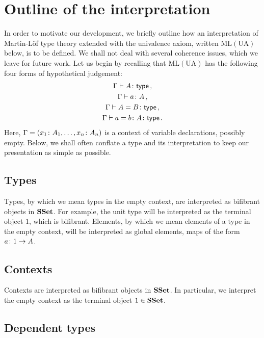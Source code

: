 \documentclass[reqno,10pt,a4paper,oneside,draft]{amsart}
\begin{document}
\section{Outline of the interpretation} 

In order to motivate our development, we briefly outline how an interpretation of Martin-L\"of type theory 
extended with the univalence axiom, written $\mathrm{ML(UA)}$ below, is to be defined. We shall not deal with several coherence issues, which we leave for future work. Let us begin by recalling that  $\mathrm{ML(UA)}$ has the following four forms of hypothetical judgement:
\begin{gather*}
 \Gamma \vdash A \colon \mathsf{type} \, ,  \\ 
 \Gamma \vdash a \colon A \, , \\
  \Gamma \vdash A  = B \colon \mathsf{type} \, ,  \\
 \Gamma \vdash a = b \colon A \colon \mathsf{type} \, .
  \end{gather*}
Here, $\Gamma  = (x_1 \colon A_1, \ldots, x_n \colon A_n)$ is a  context of variable declarations, possibly empty. Below, we shall often conflate a type and its interpretation to keep our presentation as simple as possible.

\subsection*{Types}

Types, by which we mean types in the empty context, are interpreted as bifibrant objects in $\mathbf{SSet}$. For example, the unit type will be interpreted as the terminal object $1$, which is bifibrant. Elements, by which we mean elements of a type in the empty context, will be interpreted as global elements, \ie maps of the form $a \colon 1 \to A$.


\subsection*{Contexts}

Contexts are interpreted as bifibrant objects in $\mathbf{SSet}$. In particular, we interpret the empty context as the terminal object $1 \in \mathbf{SSet}$. 

\subsection*{Dependent types} 
\end{document}
